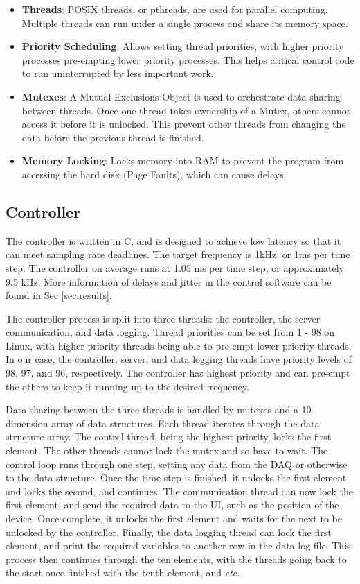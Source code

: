 \documentclass[12pt]{report}
\begin{document}
\begin{itemize}
	\item \textbf{Threads}: POSIX threads, or pthreads, are used for parallel computing. Multiple threads can run under a single process and share its memory space.
	\item \textbf{Priority Scheduling}: Allows setting thread priorities, with higher priority processes pre-empting lower priority processes. This helps critical control code to run uninterrupted by less important work. 
	\item \textbf{Mutexes}: A Mutual Exclusions Object is used to orchestrate data sharing between threads. Once one thread takes ownership of a Mutex, others cannot access it before it is unlocked. This prevent other threads from changing the data before the previous thread is finished. 
	\item \textbf{Memory Locking}: Locks memory into RAM to prevent the program from accessing the hard disk (Page Faults), which can cause delays. 
\end{itemize}
	
	\subsection{Controller}
	
	The controller is written in C, and is designed to achieve low latency so that it can meet sampling rate deadlines. The target frequency is 1kHz, or 1ms per time step. The controller on average runs at 1.05 ms per time step, or approximately 9.5 kHz. More information of delays and jitter in the control software can be found in Sec \ref{sec:results}. 
	

	
	
	The controller process is split into three threads: the controller, the server communication, and data logging. Thread priorities can be set from 1 - 98 on Linux, with higher priority threads being able to pre-empt lower priority threads. In our case, the controller, server, and data logging threads have priority levels of 98, 97, and 96, respectively. The controller has highest priority and can pre-empt the others to keep it running up to the desired frequency. 
	
	Data sharing between the three threads is handled by mutexes and a 10 dimension array of data structures. Each thread iterates through the data structure array. The control thread, being the highest priority, locks the first element. The other threads cannot lock the mutex and so have to wait. The control loop runs through one step, setting any data from the DAQ or otherwise to the data structure. Once the time step is finished, it unlocks the first element and locks the second, and continues. The communication thread can now lock the first element, and send the required data to the UI, such as the position of the device. Once complete, it unlocks the first element and waits for the next to be unlocked by the controller. Finally, the data logging thread  can lock the first element, and print the required variables to another row in the data log file. This process then continues through the ten elements, with the threads going back to the start once finished with the tenth element, and \textit{etc}. 
	
\end{document}
